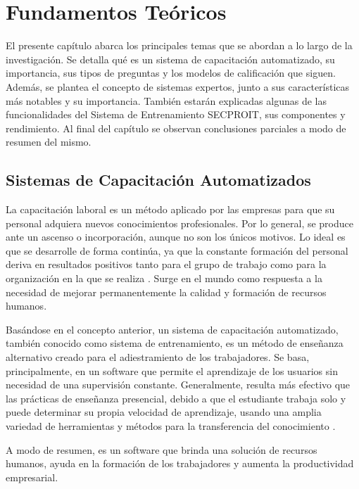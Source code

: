 \chapter{Fundamentos Teóricos}
El presente capítulo abarca los principales temas que se abordan a lo largo de la investigación. Se detalla qué es un sistema de capacitación automatizado, su importancia, sus tipos de preguntas y los modelos de calificación que siguen. Además, se plantea el concepto de sistemas expertos, junto a sus características más notables y su importancia. También estarán explicadas algunas de las funcionalidades del Sistema de Entrenamiento SECPROIT, sus componentes y rendimiento.
Al final del capítulo se observan conclusiones parciales a modo de resumen del mismo.

\section{Sistemas de Capacitación Automatizados}
La capacitación laboral es un método aplicado por las empresas para que su personal adquiera nuevos conocimientos profesionales. Por lo general, se produce ante un ascenso o incorporación, aunque no son los únicos motivos. Lo ideal es que se desarrolle de forma continúa, ya que la constante formación del personal deriva en resultados positivos tanto para el grupo de trabajo como para la organización en la que se realiza \cite{blogBizneo}.
Surge en el mundo como respuesta a la necesidad de mejorar permanentemente la calidad y formación de recursos humanos.

Basándose en el concepto anterior, un sistema de capacitación automatizado, también conocido como sistema de entrenamiento, es un método de enseñanza alternativo creado para el adiestramiento de los trabajadores. Se basa, principalmente, en un software que permite el aprendizaje de los usuarios sin necesidad de una supervisión constante. Generalmente, resulta más efectivo que las prácticas de enseñanza presencial, debido a que el estudiante trabaja solo y puede determinar su propia velocidad de aprendizaje, usando una amplia variedad de herramientas y métodos para la transferencia del conocimiento \cite{seguridadMinera}.

A modo de resumen, es un software que brinda una solución de recursos humanos, ayuda en la formación de los trabajadores y aumenta la productividad empresarial.

